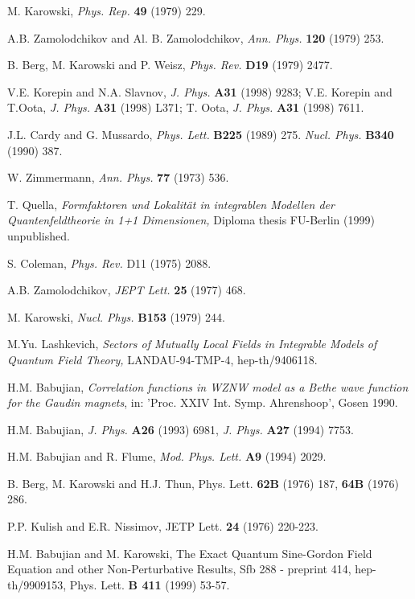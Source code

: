 \documentclass[a4paper,a4paper]{article}
\begin{document}
\begin{thebibliography}{99}
  M. Karowski, \emph{Phys. Rep.} \textbf{49} (1979) 229.

  A.B. Zamolodchikov and Al. B. Zamolodchikov, \emph{Ann. Phys.} 
\textbf{120} (1979) 253.

  B. Berg, M. Karowski and P. Weisz, \emph{Phys. Rev.} \textbf{%
D19} (1979) 2477.

  V.E. Korepin and N.A. Slavnov, \emph{J. Phys.} \textbf{A31%
} (1998) 9283;\newline
V.E. Korepin and T.Oota, \emph{J. Phys.} \textbf{A31} (1998) L371;\newline
T. Oota, \emph{J. Phys.} \textbf{A31} (1998) 7611.

  J.L. Cardy and G. Mussardo, \emph{Phys. Lett.} \textbf{B225}
(1989) 275. \emph{Nucl. Phys.} \textbf{B340} (1990) 387.

  W. Zimmermann, \emph{Ann. Phys.} \textbf{77} (1973) 536.

  T. Quella, \emph{Formfaktoren und Lokalit\"{a}t in integrablen
Modellen der Quan\-ten\-feld\-theo\-rie in 1+1 Dimensionen,} Diploma thesis
FU-Berlin (1999) unpublished.

  S. Coleman, \emph{Phys. Rev.} {D11} (1975) 2088.

  A.B. Zamolodchikov, \emph{JEPT Lett.} \textbf{25} (1977) 468.

  M. Karowski, \emph{Nucl. Phys.} \textbf{B153} (1979) 244.

  M.Yu. Lashkevich, \emph{Sectors of Mutually Local Fields in
Integrable Models of Quantum Field Theory, }LANDAU-94-TMP-4, hep-th/9406118.

  H.M. Babujian, \emph{Correlation functions in WZNW model as a
Bethe wave function for the Gaudin magnets}, in: 'Proc. XXIV Int. Symp.
Ahrenshoop', Gosen 1990.

  H.M. Babujian, \emph{J. Phys.} \textbf{A26} (1993) 6981, \emph{%
J. Phys.} \textbf{A27} (1994) 7753.

  H.M. Babujian and R. Flume, \emph{Mod. Phys. Lett.} \textbf{A9}
(1994) 2029.

  B. Berg, M. Karowski and H.J. Thun, Phys. Lett. \textbf{62B}
(1976) 187, \textbf{64B} (1976) 286.

  P.P. Kulish and E.R. Nissimov, JETP Lett. \textbf{24}
  (1976) 220-223.

  H.M. Babujian and M. Karowski, The Exact Quantum Sine-Gordon
Field Equation and other Non-Perturbative Results, Sfb 288 - preprint 414,
hep-th/9909153, Phys. Lett. \textbf{B 411} (1999) 53-57.


\end{thebibliography}
\end{document}
